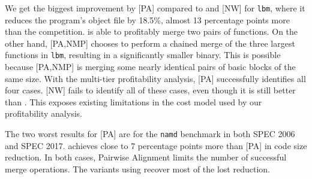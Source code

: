 We get the biggest improvement by {[PA]} compared to {\SOAName} and {[NW]} for \texttt{lbm}, where it reduces the program's object file by 18.5\%, almost 13 percentage points more than the competition.
{\SOAName} is able to profitably merge two pairs of functions.
On the other hand, {[PA,NMP]} chooses to perform a chained merge of the three largest functions in \texttt{lbm}, resulting in a significantly smaller binary.
This is possible because {[PA,NMP]} is merging some nearly identical pairs of basic blocks of the same size.
With the multi-tier profitability analysis, {[PA]} successfully identifies all four cases. 
{[NW]} fails to identify all of these cases, even though it is still better than {\SOAName}.
This exposes existing limitations in the cost model used by our profitability analysis.

The two worst results for {[PA]} are for the \texttt{namd} benchmark in both SPEC 2006 and SPEC 2017. {\SOAName} achieves close to 7 percentage points more than {[PA]} in code size reduction.
In both cases, Pairwise Alignment limits the number of successful merge operations. The variants using {\NW} recover most of the lost reduction. 




